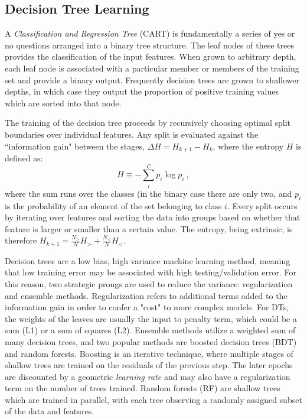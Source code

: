 \subsection{Decision Tree Learning}

A \textit{Classification and Regression Tree} (CART) is fundamentally a series of yes or no questions arranged into a binary tree structure\cite{breiman_classification_2017}.
The leaf nodes of these trees provides the classification of the input features.
When grown to arbitrary depth, each leaf node is associated with a particular member or members of the training set and provide a binary output.
Frequently decision trees are grown to shallower depths, in which case they output the  proportion of positive training values which are sorted into that node.

The training of the decision tree proceeds by recursively choosing optimal split boundaries over individual features. 
Any split is evaluated against the ``information gain" between the stages\cite{burkov_hundred-page_2019}, $\Delta H = H_{k+1} - H_k$, where the entropy $H$ is defined as:
\begin{equation}
    H \equiv -\sum_i^C p_i\log p_i~,
    \label{eq:info}
\end{equation}
\noindent
where the sum runs over the classes (in the binary case there are only two, and $p_i$ is the probability of an element of the set belonging to class $i$.
Every split occurs by iterating over features and sorting the data into groups based on whether that feature is larger or smaller than a certain value.
The entropy, being extrinsic, is therefore $H_{k+1} = \frac{N_>}{N}H_> + \frac{N_<}{N}H_<$.

Decision trees are a low bias, high variance machine learning method, meaning that low training error may be associated with high testing/validation error.
For this reason, two strategic prongs are used to reduce the variance: regularization and ensemble methods.
Regularization refers to additional terms added to the information gain in order to confer a "cost" to more complex models.
For DTs, the weights of the leaves are usually the input to penalty term, which could be a sum (L1) or a sum of squares (L2).
Ensemble methods utilize a weighted sum of many decision trees, and two popular methods are boosted decision trees (BDT) and random forests\cite{louppe_understanding_2015}. 
Boosting is an iterative technique, where multiple stages of shallow trees are trained on the residuals of the previous step.
The later epochs are discounted by a geometric \textit{learning rate} and may also have a regularization term on the number of trees trained.
Random forests (RF) are shallow trees which are trained in parallel, with each tree observing a randomly assigned subset of the data and features.

